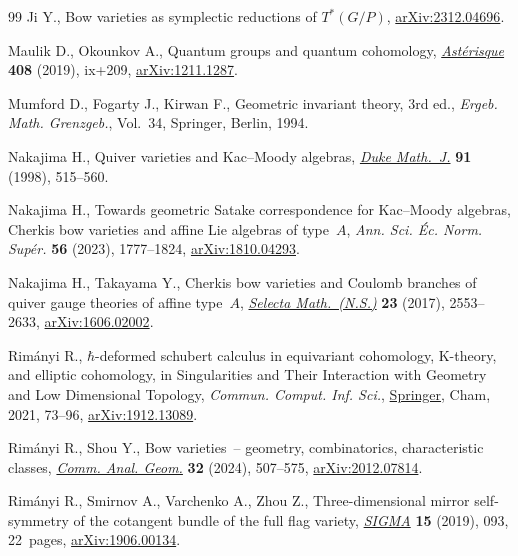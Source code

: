 \documentclass[pdftex]{sigma}
\numberwithin{equation}{section}
\begin{document}
\begin{thebibliography}{99}
Ji Y., Bow varieties as symplectic reductions of {$T^*(G/P)$},
 \href{https://arxiv.org/abs/2312.04696}{arXiv:2312.04696}.

Maulik D., Okounkov A., Quantum groups and quantum cohomology,
 \href{https://doi.org/10.24033/ast}{\textit{Ast\'erisque}} \textbf{408} (2019), ix+209, \href{https://arxiv.org/abs/1211.1287}{arXiv:1211.1287}.

Mumford D., Fogarty J., Kirwan F., Geometric invariant theory, 3rd ed., \textit{Ergeb.
 Math. Grenzgeb.}, Vol.~34, Springer, Berlin, 1994.

Nakajima H., Quiver varieties and {K}ac--{M}oody algebras, \href{https://doi.org/10.1215/S0012-7094-98-09120-7}{\textit{Duke
 Math.~J.}} \textbf{91} (1998), 515--560.

Nakajima H., Towards geometric {S}atake correspondence for {K}ac--{M}oody
 algebras, {C}herkis bow varieties and affine {L}ie algebras of type~{$A$},
 \textit{Ann. Sci. \'Ec. Norm. Sup\'er.} \textbf{56} (2023), 1777--1824,
 \href{https://arxiv.org/abs/1810.04293}{arXiv:1810.04293}.

Nakajima H., Takayama Y., Cherkis bow varieties and {C}oulomb branches of
 quiver gauge theories of affine type~{$A$}, \href{https://doi.org/10.1007/s00029-017-0341-7}{\textit{Selecta Math.~(N.S.)}}
 \textbf{23} (2017), 2553--2633, \href{https://arxiv.org/abs/1606.02002}{arXiv:1606.02002}.

Rim\'anyi R., $\hbar$-deformed schubert calculus in equivariant cohomology,
 {K}-theory, and elliptic cohomology, in Singularities and {T}heir {I}nteraction
 with {G}eometry and {L}ow {D}imensional {T}opology, \textit{Commun. Comput. Inf. Sci.}, \href{https://doi.org/10.1007/978-3-030-61958-9_5}{Springer}, Cham, 2021, 73--96, \href{https://arxiv.org/abs/1912.13089}{arXiv:1912.13089}.

Rim\'anyi R., Shou Y., Bow varieties~-- geometry, combinatorics, characteristic
 classes, \href{https://doi.org/10.4310/cag.241015012209}{\textit{Comm. Anal. Geom.}} \textbf{32} (2024), 507--575,
 \href{https://arxiv.org/abs/2012.07814}{arXiv:2012.07814}.

Rim\'anyi R., Smirnov A., Varchenko A., Zhou Z., Three-dimensional mirror
 self-symmetry of the cotangent bundle of the full flag variety,
 \href{https://doi.org/10.3842/SIGMA.2019.093}{\textit{SIGMA}} \textbf{15} (2019), 093, 22~pages, \href{https://arxiv.org/abs/1906.00134}{arXiv:1906.00134}.


\end{thebibliography}
\end{document}
